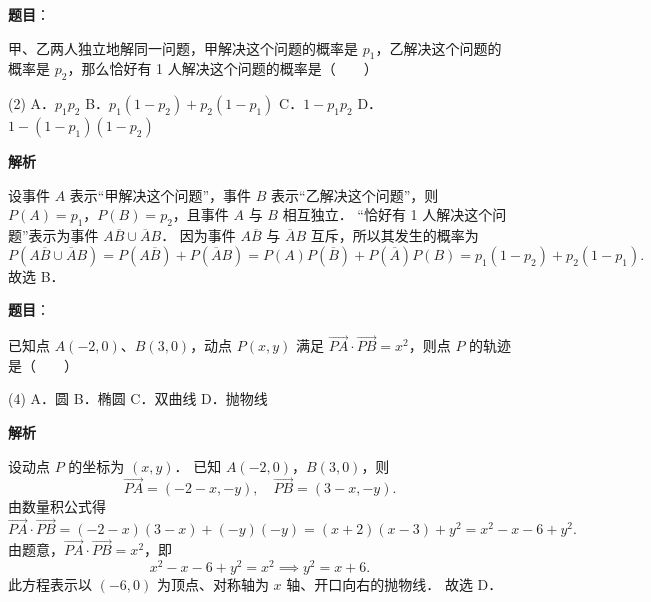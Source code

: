 \begin{answer}

\textbf{题目}：

甲、乙两人独立地解同一问题，甲解决这个问题的概率是 $p_1$，乙解决这个问题的概率是 $p_2$，那么恰好有 1 人解决这个问题的概率是\mbox{（　　）}

\begin{gkopts}(2)
\task A．$p_1 p_2$
\task B．$p_1(1 - p_2) + p_2(1 - p_1)$
\task C．$1 - p_1 p_2$
\task D．$1 - (1 - p_1)(1 - p_2)$
\end{gkopts}

\textbf{解析}

设事件 $A$ 表示“甲解决这个问题”，事件 $B$ 表示“乙解决这个问题”，则 $P(A) = p_1$，$P(B) = p_2$，且事件 $A$ 与 $B$ 相互独立．
“恰好有 1 人解决这个问题”表示为事件 $A\overline{B} \cup \overline{A}B$．
因为事件 $A\overline{B}$ 与 $\overline{A}B$ 互斥，所以其发生的概率为
\nopagebreak[4]
\[
P(A\overline{B} \cup \overline{A}B) = P(A\overline{B}) + P(\overline{A}B) = P(A)P(\overline{B}) + P(\overline{A})P(B) = p_1(1 - p_2) + p_2(1 - p_1).
\]
故选 B．


\end{answer}
\begin{answer}

\textbf{题目}：

已知点 $A(-2, 0)$、$B(3, 0)$，动点 $P(x, y)$ 满足 $\vec{PA} \cdot \vec{PB} = x^2$，则点 $P$ 的轨迹是\mbox{（　　）}

\begin{gkopts}(4)
\task A．圆
\task B．椭圆
\task C．双曲线
\task D．抛物线
\end{gkopts}

\textbf{解析}

设动点 $P$ 的坐标为 $(x, y)$．
已知 $A(-2, 0)$，$B(3, 0)$，则
\nopagebreak[4]
\[
\vec{PA} = (-2 - x, -y), \quad \vec{PB} = (3 - x, -y).
\]
由数量积公式得
\nopagebreak[4]
\[
\vec{PA} \cdot \vec{PB} = (-2 - x)(3 - x) + (-y)(-y) = (x + 2)(x - 3) + y^2 = x^2 - x - 6 + y^2.
\]
由题意，$\vec{PA} \cdot \vec{PB} = x^2$，即
\nopagebreak[4]
\[
x^2 - x - 6 + y^2 = x^2 \implies y^2 = x + 6.
\]
此方程表示以 $(-6, 0)$ 为顶点、对称轴为 $x$ 轴、开口向右的抛物线．
故选 D．


\end{answer}
